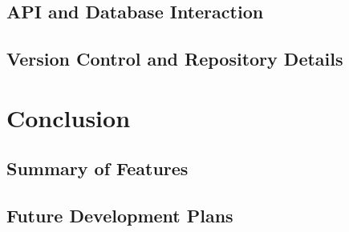 \documentclass[12pt]{article}
\begin{document}
\subsection{API and Database Interaction}
\subsection{Version Control and Repository Details}

\newpage
\section{Conclusion}
\subsection{Summary of Features}
\subsection{Future Development Plans}
\end{document}

